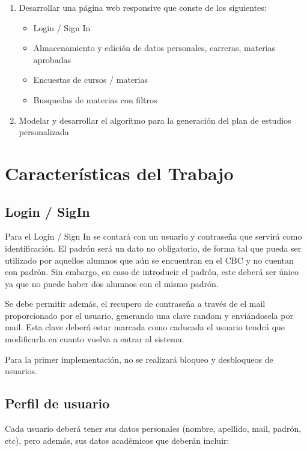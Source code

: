 \documentclass[a4paper]{article}
\begin{document}
\begin{enumerate}
	\item Desarrollar una página web responsive que conste de los siguientes:
		\begin{itemize}
			\item Login / Sign In
			\item Almacenamiento y edición de datos personales, carreras, materias aprobadas
			\item Encuestas de cursos / materias
			\item Busquedas de materias con filtros
		\end{itemize}
		
	\item Modelar y desarrollar el algoritmo para la generación del plan de estudios personalizada
\end{enumerate}

\section{Características del Trabajo}

\subsection{Login / SigIn}

Para el Login / Sign In se contará con un usuario y contraseña que servirá como identificación. El padrón será un dato no obligatorio, de forma tal que pueda ser utilizado por aquellos alumnos que aún se encuentran en el CBC y no cuentan con padrón. Sin embargo, en caso de introducir el padrón, este deberá ser único ya que no puede haber dos alumnos con el mismo padrón.

Se debe permitir además, el recupero de contraseña a través de el mail proporcionado por el usuario, generando una clave random y enviándosela por mail. Esta clave deberá estar marcada como caducada  el usuario tendrá que modificarla en cuanto vuelva a entrar al sistema.

Para la primer implementación, no se realizará bloqueo y desbloqueos de usuarios.

\subsection{Perfil de usuario}

Cada usuario deberá tener sus datos personales (nombre, apellido, mail, padrón, etc), pero además, sus datos académicos que deberán incluir:
\end{document}

